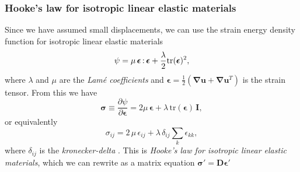 \documentclass[acmtog]{acmart}
\newcommand{\ddotproduct}[2]{#1 \hspace{-1pt}:\hspace{-1pt} #2}
\begin{document}
\subsubsection*{Hooke's law for isotropic linear elastic materials}
Since we have assumed small displacements, we can use the strain energy density
function for isotropic linear elastic materials
%
\begin{equation}
  \psi = \mu \, \ddotproduct{\boldsymbol \epsilon}{\boldsymbol \epsilon} + \frac{\lambda}{2} \mathrm{tr}(\boldsymbol \epsilon)^2,
\end{equation}
%
where $\lambda$ and $\mu$ are the \textit{Lamé coefficients} and $\boldsymbol \epsilon = \frac{1}{2} (\boldsymbol \nabla \boldsymbol u + \boldsymbol \nabla \boldsymbol u^T)$ is the strain tensor. From this we have
%
\begin{equation}
  \boldsymbol \sigma \equiv \frac{ \partial \psi }{ \partial \boldsymbol \epsilon } = 2 \mu \, \boldsymbol \epsilon + \lambda \,\mathrm{tr}(\boldsymbol \epsilon) \, \boldsymbol I,
\end{equation}
%
or equivalently
%
\begin{equation}
  \sigma_{ij} = 2 \,\mu \,\epsilon_{ij} + \lambda \,\delta_{ij} \sum_k \epsilon_{kk},
\end{equation}
%
where $\delta_{ij}$ is the \textit{kronecker-delta} . This is \textit{Hooke's
  law for isotropic linear elastic materials}, which we can rewrite as a matrix equation $\boldsymbol \sigma' = \boldsymbol D \boldsymbol \epsilon'$
%
\end{document}
